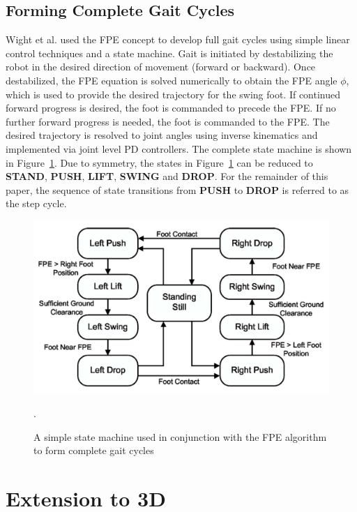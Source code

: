 \subsection{Forming Complete Gait Cycles} %
\label{sub:gait_cycles}
Wight et al. \cite{Wight:2008ii} used the FPE concept to develop full gait cycles using simple linear control techniques and a state machine. Gait is initiated by destabilizing the robot in the desired direction of movement (forward or backward). Once destabilized, the FPE equation is solved numerically to obtain the FPE angle $\phi$, which is used to provide the desired trajectory for the swing foot.  If continued forward progress is desired, the foot is commanded to precede the FPE. If no further forward progress is needed, the foot is commanded to the FPE. The desired trajectory is resolved to joint angles using inverse kinematics and implemented via joint level PD controllers. The complete state machine is shown in Figure~\ref{fig:statemachine}. Due to symmetry, the states in Figure~\ref{fig:statemachine} can be reduced to \textbf{STAND}, \textbf{PUSH}, \textbf{LIFT}, \textbf{SWING} and \textbf{DROP}. For the remainder of this paper, the sequence of state transitions from \textbf{PUSH} to \textbf{DROP} is referred to as the step cycle.

\begin{figure}[!h]
	\centering
    \includegraphics[scale=0.3]{fig/ch4/fpestatemachine.png}
  	\caption{A simple state machine used in conjunction with the FPE algorithm to form complete gait cycles}.
	\label{fig:statemachine}
\end{figure}



\section{Extension to 3D} %
\label{sec:extension_to_3d}

